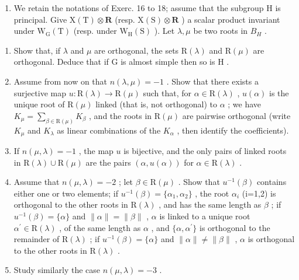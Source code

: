 \begin{enumerate}
\def\labelenumi{\arabic{enumi})}
\setcounter{enumi}{18}
\tightlist
\item
  We retain the notations of Exerc. 16 to 18; assume that the subgroup H is principal. Give \(\mathrm{X(T)\otimes\mathbf{R}}\) (resp. \(\mathrm{X(S)\otimes\mathbf{R}}\) ) a scalar product invariant under \(\mathrm{W_{G}(T)}\) (resp. under \(\mathrm{W_{H}(S)}\) ). Let \(\lambda,\mu\) be two roots in \(B_{H}\) .
\end{enumerate}

\begin{enumerate}
\def\labelenumi{\alph{enumi})}
\item
  Show that, if \(\lambda\) and \(\mu\) are orthogonal, the sets \(\mathrm{R}(\lambda)\) and \(\mathrm{R}(\mu)\) are orthogonal. Deduce that if \(\mathrm{G}\) is almost simple then so is \(\mathrm{H}\) .
\item
  Assume from now on that \(n(\lambda, \mu) = -1\) . Show that there exists a surjective map \(u: \mathrm{R}(\lambda) \to \mathrm{R}(\mu)\) such that, for \(\alpha \in \mathrm{R}(\lambda)\) , \(u(\alpha)\) is the unique root of \(\mathrm{R}(\mu)\) linked (that is, not orthogonal) to \(\alpha\) ; we have \(K_{\mu} = \sum_{\beta \in \mathrm{R}(\mu)} K_{\beta}\) , and the roots in \(\mathrm{R}(\mu)\) are pairwise orthogonal (write \(K_{\mu}\) and \(K_{\lambda}\) as linear combinations of the \(K_{\alpha}\) , then identify the coefficients).
\item
  If \(n(\mu, \lambda) = -1\) , the map \(u\) is bijective, and the only pairs of linked roots in \(\mathrm{R}(\lambda) \cup \mathrm{R}(\mu)\) are the pairs \((\alpha, u(\alpha))\) for \(\alpha \in \mathrm{R}(\lambda)\) .
\item
  Assume that \(n(\mu,\lambda)=-2\) ; let \(\beta\in\mathrm{R}(\mu)\) . Show that \(u^{-1}(\beta)\) contains either one or two elements; if \(u^{-1}(\beta)=\{\alpha_{1},\alpha_{2}\}\) , the root \(\alpha_{i}\) (i=1,2) is orthogonal to the other roots in \(\mathrm{R}(\lambda)\) , and has the same length as \(\beta\) ; if \(u^{-1}(\beta)=\{\alpha\}\) and \(\|\alpha\|=\|\beta\|\) , \(\alpha\) is linked to a unique root \(\alpha^{\prime}\in\mathrm{R}(\lambda)\) , of the same length as \(\alpha\) , and \(\{\alpha,\alpha^{\prime}\}\) is orthogonal to the remainder of \(\mathrm{R}(\lambda)\) ; if \(u^{-1}(\beta)=\{\alpha\}\) and \(\|\alpha\|\neq\|\beta\|\) , \(\alpha\) is orthogonal to the other roots in \(\mathrm{R}(\lambda)\) .
\item
  Study similarly the case \(n(\mu, \lambda) = -3\) .
\end{enumerate}

